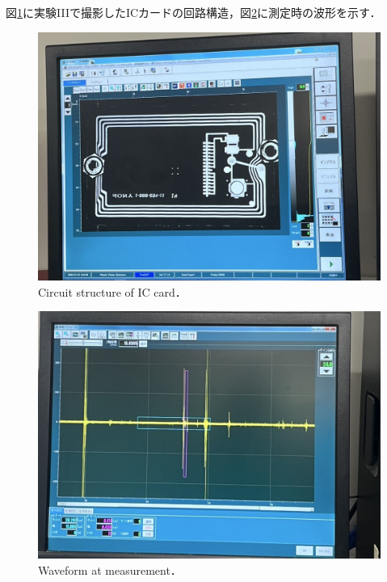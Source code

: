 \clearpage
図\ref{fig:suica}に実験IIIで撮影したICカードの回路構造，図\ref{fig:suica波形}に測定時の波形を示す．

\begin{figure}[htbp]
    \centering %
    \includegraphics[width=100truemm,clip]{fig/suica.jpg}
    \caption{Circuit structure of IC card．}
    \label{fig:suica}
\end{figure}

\begin{figure}[htbp]
    \centering %
    \includegraphics[width=100truemm,clip]{fig/suica波形.jpg}
    \caption{Waveform at measurement．}
    \label{fig:suica波形}
\end{figure}